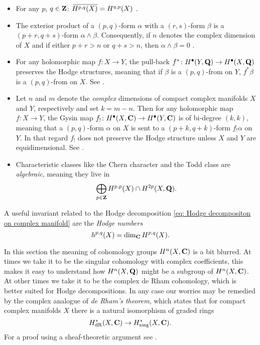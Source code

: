 \begin{itemize}[label = $\vartriangleright$ ]
    \item{For any $p$, $q \in \mathbf Z$: $\,\overline{\!{H^{p,q}(X)}} = H^{q,p}(X)$ \cite[\S II, Corollary 6.12]{Voisin2002}.}
    \item{The exterior product of a $(p,q)$-form $\alpha$ with a $(r,s)$-form $\beta$ is a $(p+r, q+s)$-form $\alpha \wedge \beta$. Consequently, if $n$ denotes the complex dimension of $X$ and if either $p+r > n$ or $q + s > n$, then $\alpha \wedge \beta = 0$ \cite[\S II, Corollary 6.15]{Voisin2002}}.
    \item{For any holomorphic map $f \colon X \to Y$, the pull-back $f^* \colon H^{\bullet}(Y, \mathbf Q) \to H^{\bullet}(X, \mathbf Q)$ preserves the Hodge structures, meaning that if $\beta$ is a $(p,q)$-from on $Y$, $f^*\beta$ is a $(p,q)$-from on $X$. See \cite[\S 7.3.2]{Voisin2002}.}
    \item{Let $n$ and $m$ denote the \emph{complex} dimensions of compact complex manifolds $X$ and $Y$, respectively and set $k = m-n$. Then for any holomorphic map $f \colon X \to Y$, the Gysin map $f_! \colon H^{\bullet}(X, \mathbf C) \to H^{\bullet}(Y, \mathbf C)$ is of bi-degree $(k,k)$, meaning that a $(p,q)$-form $\alpha$ on $X$ is sent to a $(p+k, q+k)$-form $f_!\alpha$ on $Y$. In that regard $f_!$ does not preserve the Hodge structure unless $X$ and $Y$ are equidimensional. See \cite[\S 7.3.2]{Voisin2002}.}
    \item{Characteristic classes like the Chern character and the Todd class are \emph{algebraic}, meaning they live in
    \[
        \bigoplus_{p \in \mathbf Z} H^{p,p}(X) \cap H^{2p}(X, \mathbf Q).
    \]} 
\end{itemize} 

A useful invariant related to the Hodge decomposition \eqref{eq: Hodge decompositon on complex manifold} are the \emph{Hodge numbers}
\[
    h^{p,q}(X) = \dim_{\mathbf C} H^{p,q}(X).
\]

\begin{remark}
    In this section the meaning of cohomology groups $H^{n}(X, \mathbf C)$ is a bit blurred. At times we take it to be the singular cohomology with complex coefficients, this makes it easy to understand how $H^{n}(X, \mathbf Q)$ might be a subgroup of $H^{n}(X, \mathbf C)$. At other times we take it to be the complex de Rham cohomology, which is better suited for Hodge decompositions. In any case our worries may be remedied by the complex analogue of \emph{de Rham's theorem}, which states that for compact complex manifolds $X$ there is a natural isomorphism of graded rings
    \[
        H^*_{\operatorname{dR}}(X, \mathbf C) \to H^*_{\operatorname{sing}}(X, \mathbf C).
    \]
    For a proof using a sheaf-theoretic argument see \cite[p.\ 43--45]{GriffithsHarris1994}.
\end{remark}


